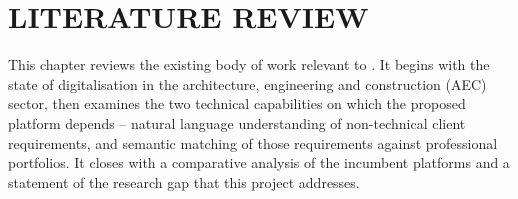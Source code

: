 %
%
%
%
%
\chapter{LITERATURE REVIEW}
\label{ch:literature-review}

This chapter reviews the existing body of work relevant to
\fypProjectTitle{}. It begins with the state of digitalisation in the
architecture, engineering and construction (AEC) sector, then examines
the two technical capabilities on which the proposed platform depends --
natural language understanding of non-technical client requirements, and
semantic matching of those requirements against professional portfolios.
It closes with a comparative analysis of the incumbent platforms and a
statement of the research gap that this project addresses.

